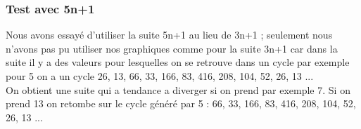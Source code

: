 \subsubsection{Test avec 5n+1}
Nous avons essayé d'utiliser la suite 5n+1 au lieu de 3n+1 ; seulement nous n'avons pas pu utiliser nos graphiques comme pour la suite 3n+1 car dans la suite il y a des valeurs pour lesquelles on se retrouve dans un cycle par exemple pour 5 on a un cycle 26, 13, 66, 33, 166, 83, 416, 208, 104, 52, 26, 13 ...\\
On obtient une suite qui a tendance a diverger si on prend par exemple 7. Si on prend 13 on retombe sur le cycle généré par 5 : 66, 33, 166, 83, 416, 208, 104, 52, 26, 13 ...




